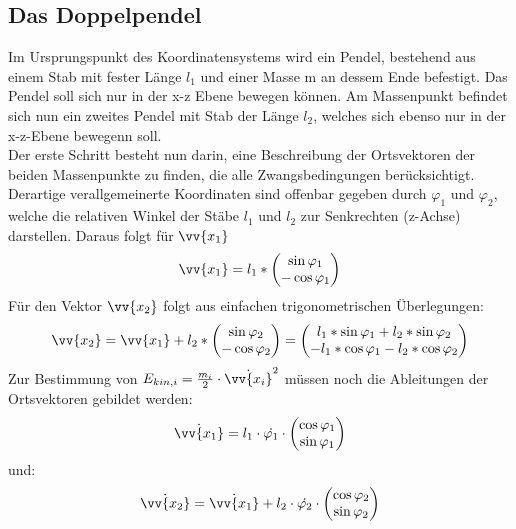 \subsection{Das Doppelpendel}
Im Ursprungspunkt des Koordinatensystems wird ein Pendel, bestehend aus einem Stab mit fester Länge $l_1$ und einer Masse m an dessem Ende befestigt. Das Pendel soll sich nur in der x-z Ebene bewegen können. Am Massenpunkt befindet sich nun ein zweites Pendel mit Stab der Länge $l_2$, welches sich ebenso nur in der x-z-Ebene bewegenn soll. \\
Der erste Schritt besteht nun darin, eine Beschreibung der Ortsvektoren der beiden Massenpunkte zu finden, die alle Zwangsbedingungen berücksichtigt. 
Derartige verallgemeinerte Koordinaten sind offenbar gegeben durch $ \varphi_1 $ und $ \varphi_2 $, welche die relativen Winkel der Stäbe $l_1 $ und $l_2$ zur Senkrechten (z-Achse) darstellen. Daraus folgt für $ \vv{x_1} $
\begin{equation}
\vv{x_1}= l_1*\begin{pmatrix}
\sin \varphi_1 \\ -\cos \varphi_1
\end{pmatrix}
\end{equation}
Für den Vektor $\vv{x_2}$ folgt aus einfachen trigonometrischen Überlegungen:
\begin{equation}
\vv{x_2}= \vv{x_1} + l_2 * \begin{pmatrix}
\sin \varphi_2 \\ -\cos \varphi_2
\end{pmatrix}
= \begin{pmatrix}
l_1 * \sin \varphi_1 + l_2 * \sin \varphi_2 \\ - l_1 * \cos \varphi_1 - l_2 * \cos \varphi_2
\end{pmatrix}
\end{equation}
Zur Bestimmung von $E_{kin,i} = \frac{m_i}{2} \cdot  \dot{\vv{x_i}}^2$  müssen noch die Ableitungen der Ortsvektoren gebildet werden:
\begin{equation}
\dot{\vv{x_1}} = l_1 \cdot \dot{\varphi_1} \cdot \begin{pmatrix}
\cos \varphi_1 \\ \sin \varphi_1
\end{pmatrix}
\end{equation}
und:
\begin{equation}
\dot{\vv{x_2}} = \dot{\vv{x_1}} + l_2 \cdot  \dot{\varphi_2} \cdot \begin{pmatrix}
\cos \varphi_2 \\ \sin \varphi_2
\end{pmatrix} 
\end{equation}
